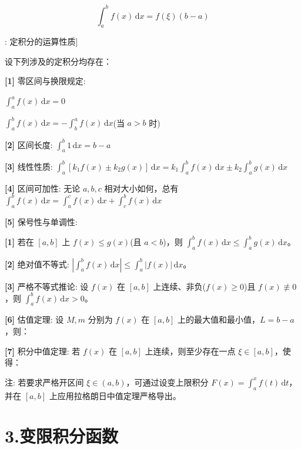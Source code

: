 \documentclass[11pt,a4paper,UTF8]{ctexart}
\begin{document}
\begin{equation*}
\int_a^b f(x)\,\mathrm{d}x = f(\xi)(b - a)
\end{equation*}
\begin{thmbox}[定理[2]: 定积分的运算性质]

设下列涉及的定积分均存在：

\textbf{[1]} 零区间与换限规定:

$\int_a^a f(x)\,\mathrm{d}x = 0$

$\int_a^b f(x)\,\mathrm{d}x = -\int_b^a f(x)\,\mathrm{d}x$(当 $a > b$ 时)

\textbf{[2]} 区间长度: $\int_a^b 1\,\mathrm{d}x = b - a$

\textbf{[3]} 线性性质: $\int_a^b [k_1 f(x) \pm k_2 g(x)]\,\mathrm{d}x = k_1\int_a^b f(x)\,\mathrm{d}x \pm k_2\int_a^b g(x)\,\mathrm{d}x$

\textbf{[4]} 区间可加性: 无论 $a, b, c$ 相对大小如何，总有 $\int_a^b f(x)\,\mathrm{d}x = \int_a^c f(x)\,\mathrm{d}x + \int_c^b f(x)\,\mathrm{d}x$

\textbf{[5]} 保号性与单调性:

\textbf{[1]} 若在 $[a, b]$ 上 $f(x) \leqslant g(x)$(且 $a < b$)，则 $\int_a^b f(x)\,\mathrm{d}x \leqslant \int_a^b g(x)\,\mathrm{d}x$。

\textbf{[2]} 绝对值不等式: $\left\vert{}\int_a^b f(x)\,\mathrm{d}x\right\vert{} \leqslant \int_a^b \vert{}f(x)\vert{}\,\mathrm{d}x$。

\textbf{[3]} 严格不等式推论: 设 $f(x)$ 在 $[a, b]$ 上连续、非负($f(x) \geqslant 0$)且 $f(x) \not\equiv 0$，则 $\int_a^b f(x)\,\mathrm{d}x > 0$。

\textbf{[6]} 估值定理: 设 $M, m$ 分别为 $f(x)$ 在 $[a, b]$ 上的最大值和最小值，$L = b - a$，则：


\textbf{[7]} 积分中值定理: 若 $f(x)$ 在 $[a, b]$ 上连续，则至少存在一点 $\xi \in [a, b]$，使得：


注: 若要求严格开区间 $\xi \in (a, b)$，可通过设变上限积分 $F(x) = \int_a^x f(t)\,\mathrm{d}t$，并在 $[a, b]$ 上应用拉格朗日中值定理严格导出。

\end{thmbox}

\section{3.变限积分函数}
\end{document}
